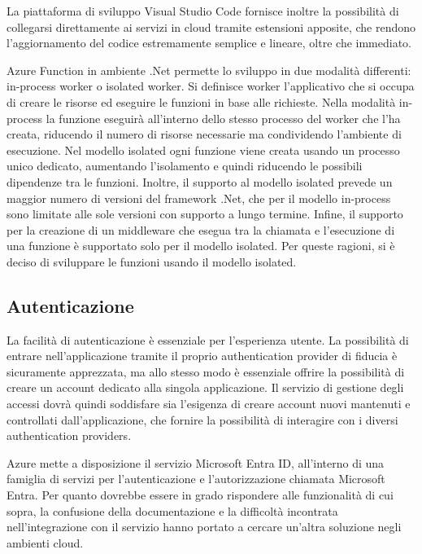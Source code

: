 La piattaforma di sviluppo Visual Studio Code fornisce inoltre la possibilità di collegarsi direttamente ai servizi in cloud tramite estensioni apposite, che rendono l’aggiornamento del codice estremamente semplice e lineare, oltre che immediato.

Azure Function in ambiente .Net permette lo sviluppo in due modalità differenti: in-process worker o isolated worker. Si definisce worker l’applicativo che si occupa di creare le risorse ed eseguire le funzioni in base alle richieste. Nella modalità in-process la funzione eseguirà all’interno dello stesso processo del worker che l’ha creata, riducendo il numero di risorse necessarie ma condividendo l’ambiente di esecuzione. Nel modello isolated ogni funzione viene creata usando un processo unico dedicato, aumentando l’isolamento e quindi riducendo le possibili dipendenze tra le funzioni. Inoltre, il supporto al modello isolated prevede un maggior numero di versioni del framework .Net, che per il modello in-process sono limitate alle sole versioni con supporto a lungo termine. Infine, il supporto per la creazione di un middleware che esegua tra la chiamata e l’esecuzione di una funzione è supportato solo per il modello isolated. 
Per queste ragioni, si è deciso di sviluppare le funzioni usando il modello isolated.

\clearpage
\subsection{Autenticazione}

	La facilità di autenticazione è essenziale per l’esperienza utente. La possibilità di entrare nell’applicazione tramite il proprio authentication provider di fiducia è sicuramente apprezzata, ma allo stesso modo è essenziale offrire la possibilità di creare un account dedicato alla singola applicazione. Il servizio di gestione degli accessi dovrà quindi soddisfare sia l’esigenza di creare account nuovi mantenuti e controllati dall’applicazione, che fornire la possibilità di interagire con i diversi authentication providers.

Azure mette a disposizione il servizio Microsoft Entra ID, all’interno di una famiglia di servizi per l’autenticazione e l’autorizzazione chiamata Microsoft Entra. Per quanto dovrebbe essere in grado rispondere alle funzionalità di cui sopra, la confusione della documentazione e la difficoltà incontrata nell’integrazione con il servizio hanno portato a cercare un’altra soluzione negli ambienti cloud.

